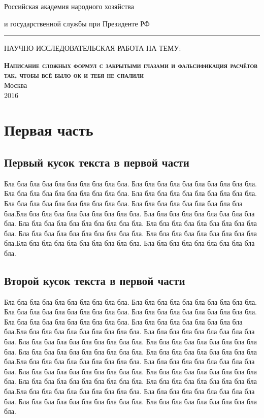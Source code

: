 \documentclass[12pt, a4paper]{article}
\begin{document}
\thispagestyle{empty}

\begin{center}
\small Российская академия народного хозяйства

 и государственной службы при Президенте РФ

 \rule{\linewidth}{0.5pt}

\vfill\normalsize НАУЧНО-ИССЛЕДОВАТЕЛЬСКАЯ РАБОТА НА ТЕМУ:

\vfill\normalsize


\Large\textsc{ \textbf{Написание сложных формул с закрытыми глазами и фальсификация расчётов так, чтобы всё было ок и тебя не спалили
}}\\

\vfill
\normalsize Москва\\ 2016

\end{center}

\newpage


\tableofcontents


\section{Первая часть}
\subsection{Первый кусок текста в первой части}

Бла бла бла бла бла бла бла бла бла бла. Бла бла бла бла бла бла бла бла бла бла. Бла бла бла бла бла бла бла бла бла бла. Бла бла бла бла бла бла бла бла бла бла. Бла бла бла бла бла бла бла бла бла бла. Бла бла бла бла бла бла бла бла бла бла.Бла бла бла бла бла бла бла бла бла бла. Бла бла бла бла бла бла бла бла бла бла. Бла бла бла бла бла бла бла бла бла бла. Бла бла бла бла бла бла бла бла бла бла. Бла бла бла бла бла бла бла бла бла бла. Бла бла бла бла бла бла бла бла бла бла.Бла бла бла бла бла бла бла бла бла бла. Бла бла бла бла бла бла бла бла бла бла.

\subsection{Второй кусок текста в первой части}
Бла бла бла бла бла бла бла бла бла бла. Бла бла бла бла бла бла бла бла бла бла. Бла бла бла бла бла бла бла бла бла бла. Бла бла бла бла бла бла бла бла бла бла. Бла бла бла бла бла бла бла бла бла бла. Бла бла бла бла бла бла бла бла бла бла.Бла бла бла бла бла бла бла бла бла бла. Бла бла бла бла бла бла бла бла бла бла. Бла бла бла бла бла бла бла бла бла бла. Бла бла бла бла бла бла бла бла бла бла. Бла бла бла бла бла бла бла бла бла бла. Бла бла бла бла бла бла бла бла бла бла.Бла бла бла бла бла бла бла бла бла бла. Бла бла бла бла бла бла бла бла бла бла. Бла бла бла бла бла бла бла бла бла бла. Бла бла бла бла бла бла бла бла бла бла. Бла бла бла бла бла бла бла бла бла бла. Бла бла бла бла бла бла бла бла бла бла.Бла бла бла бла бла бла бла бла бла бла. Бла бла бла бла бла бла бла бла бла бла. Бла бла бла бла бла бла бла бла бла бла. Бла бла бла бла бла бла бла бла бла бла.
\end{document}
